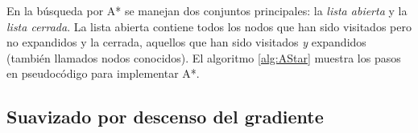 En la búsqueda por A* se manejan dos conjuntos principales: la \textit{lista abierta} y la \textit{lista cerrada}. La lista abierta contiene todos los nodos que han sido visitados pero no expandidos y la cerrada, aquellos que han sido visitados \textit{y} expandidos (también llamados nodos conocidos). El algoritmo \ref{alg:AStar} muestra los pasos en pseudocódigo para implementar A*. 

\subsection{Suavizado por descenso del gradiente}

